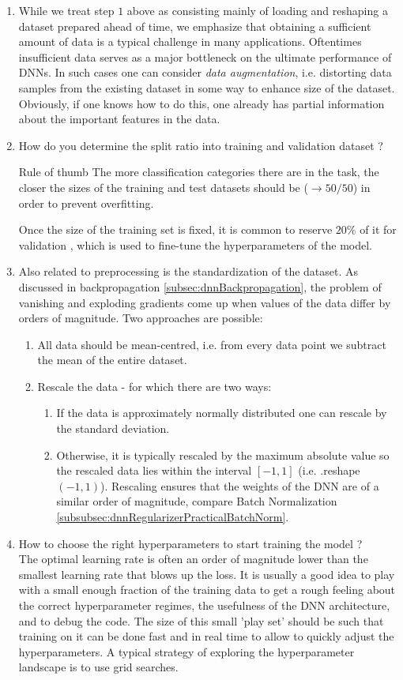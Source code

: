 \begin{enumerate}
	\item While we treat step $1$ above as consisting mainly of loading and reshaping a dataset prepared ahead of time, we emphasize that obtaining a sufficient amount of data is a typical challenge in many applications. Oftentimes insufficient data serves as a major bottleneck on the ultimate performance of DNNs. In such cases one can consider \emph{data augmentation}, i.e. distorting data samples from the existing dataset in some way to enhance size of the dataset. Obviously, if one knows how to do this, one already has partial information about the important features in the data.
	\item How do you determine the split ratio into training and validation dataset ?
	\begin{mybox}{Rule of thumb}
		The more classification categories there are in the task, the closer the sizes of the training and test datasets should be ($\rightarrow 50/50$) in order to prevent overfitting.
	\end{mybox}
	Once the size of the training set is fixed, it is common to reserve $20 \%$ of it for validation , which is used to fine-tune the hyperparameters of the model.
	\item Also related to preprocessing is the standardization of the dataset. As discussed in backpropagation \ref{subsec:dnnBackpropagation}, the problem of vanishing and exploding gradients come up when values of the data differ by orders of magnitude. Two approaches are possible:
	\begin{enumerate}
		\item All data should be mean-centred, i.e. from every data point we subtract the mean of the entire dataset.
		\item Rescale the data - for which there are two ways:
		\begin{enumerate}
			\item If the data is approximately normally distributed one can rescale by the standard deviation.
			\item Otherwise, it is typically rescaled by the maximum absolute value so the rescaled data lies within the interval $[-1,1]$ (i.e. .reshape$(-1,1)$). Rescaling ensures that the weights of the DNN are of a similar order of magnitude, compare Batch Normalization \ref{subsubsec:dnnRegularizerPracticalBatchNorm}. 
		\end{enumerate}
	\end{enumerate}
	\item How to choose the right hyperparameters to start training the model ?\\
	The optimal learning rate is often an order of magnitude lower than the smallest learning rate that blows up the loss. It is usually a good idea to play with a small enough fraction of the training data to get a rough feeling about the correct hyperparameter regimes, the usefulness of the DNN architecture, and to debug the code. The size of this small ’play set’ should be such that training on it can be done fast and in real time to allow to quickly adjust the hyperparameters. A typical strategy of exploring the hyperparameter landscape is to use grid searches.
\end{enumerate}
